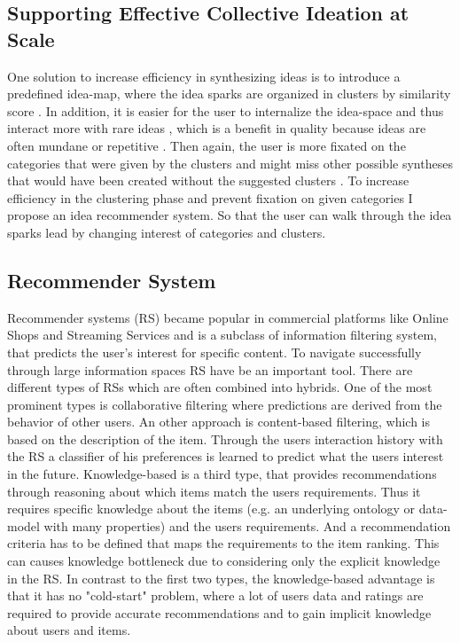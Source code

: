 \documentclass[pdftex,a4paper,12pt]{scrartcl}
\theoremstyle{definition}
\begin{document}
\subsection{Supporting Effective Collective Ideation at Scale}
    One solution to increase efficiency in synthesizing ideas is to introduce a predefined idea-map, where the idea sparks are organized in clusters by similarity score \citep[124]{siangliulue_supporting_2017}. In addition, it is easier for the user to internalize the idea-space and thus interact more with rare ideas \citep{siangliulue_supporting_2017}, which is a benefit in quality because ideas are often mundane or repetitive \citep{siangliulue_ideahound:_2016}. Then again, the user is more fixated on the categories that were given by the clusters and might miss other possible syntheses that would have been created without the suggested clusters \citep{siangliulue_supporting_2017}. To increase efficiency in the clustering phase and prevent fixation on given categories I propose an idea recommender system. So that the user can walk through the idea sparks lead by changing interest of categories and clusters. 
    
\subsection{Recommender System}

    Recommender systems (RS) became popular in commercial platforms like Online Shops and Streaming Services and is a subclass of information filtering system, that predicts the user's interest for specific content. To navigate successfully through large information spaces RS have be an important tool. There are different types of RSs which are often combined into hybrids. One of the most prominent types is collaborative filtering where predictions are derived from the behavior of other users. An other approach is content-based filtering, which is based on the description of the item. Through the users interaction history with the RS a classifier of his preferences is learned to predict what the users interest in the future. 
    Knowledge-based is a third type, that provides recommendations through reasoning about which items match the users requirements. Thus it requires specific knowledge about the items (e.g. an underlying ontology or data-model with many properties) and the users requirements. And a recommendation criteria has to be defined  that maps the requirements to the item ranking. This can causes knowledge bottleneck due to considering only the explicit knowledge in the RS.
    In contrast to the first two types, the knowledge-based advantage is that it has no "cold-start" problem, where a lot of users data and ratings are required to provide accurate recommendations and to gain implicit knowledge about users and items. 
    
\end{document}
